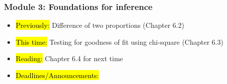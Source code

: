 
\begin{frame}
    \frametitle{Module 3: Foundations for inference}
    \begin{itemize}
        \item \hl{Previously: }Difference of two proportions (Chapter 6.2)
        \item \hl{This time: }Testing for goodness of fit using chi-square (Chapter 6.3)
        \item \hl{Reading: }Chapter 6.4 for next time
        \item \hl{Deadlines/Announcements: }
    \end{itemize}
    
\end{frame}